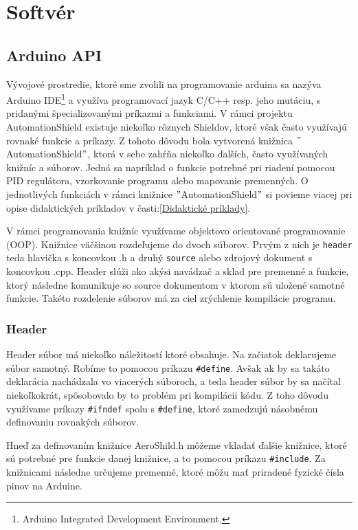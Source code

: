 \section{Softvér}
\subsection{Arduino API}
\label{ArduinoLib}

Vývojové prostredie, ktoré sme zvolili na programovanie arduina sa nazýva Arduino IDE\footnote[5]{Arduino Integrated Development Environment.} a využíva programovací jazyk C/C++ resp. jeho mutáciu, s pridanými špecializovanými príkazmi a funkciami. V rámci projektu AutomationShield existuje niekoľko rôznych Shieldov, ktoré však často využívajú rovnaké funkcie a príkazy. Z tohoto dôvodu bola vytvorená knižnica $"$AutomationShield$"$, ktorá v sebe zahŕňa niekoľko ďalších, často využívaných knižníc a súborov. Jedná sa napríklad o funkcie potrebné pri riadení pomocou PID regulátora, vzorkovanie programu alebo mapovanie premenných. O jednotlivých funkciách v rámci knižnice $"$AutomationShield$"$ si povieme viacej pri opise didaktických príkladov v časti:\ref{Didaktické príklady}.

V rámci programovania knižníc využívame objektovo orientované programovanie \newline (OOP)\cite{oop}. Knižnice väčšinou rozdeľujeme do dvoch súborov. Prvým z nich je \verb|header| teda hlavička s koncovkou .h a druhý \verb|source| alebo zdrojový dokument s koncovkou .cpp. Header slúži ako akýsi navádzač a sklad pre premenné a funkcie, ktorý následne komunikuje so source dokumentom v ktorom sú uložené samotné funkcie. Takéto rozdelenie súborov má za ciel zrýchlenie kompilácie programu\cite{546521}.


\subsubsection{Header}

Header súbor má niekoľko náležitostí ktoré obsahuje. Na začiatok deklarujeme súbor samotný. Robíme to pomocou príkazu \verb|#define|. Avšak ak by sa takáto deklarácia nachádzala vo viacerých súboroch, a teda header súbor by sa načítal niekoľkokrát, spôsobovalo by to problém pri kompilácii kódu. Z toho dôvodu využívame príkazy \verb|#ifndef| spolu s \verb|#define|, ktoré zamedzujú násobnému definovaniu rovnakých súborov. 

Hneď za definovaním knižnice AeroShild.h môžeme vkladať ďalšie knižnice, ktoré sú potrebné pre funkcie danej knižnice, a to pomocou príkazu \verb|#include|. Za knižnicami následne určujeme premenné, ktoré môžu mať priradené fyzické čísla pinov na Arduine. 

